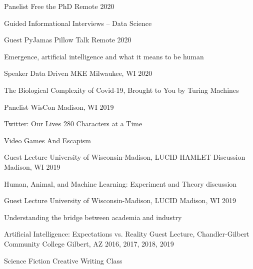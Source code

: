 \begin{cventries}
\cventry
    {Panelist}
    {Free the PhD}
    {Remote}
    {2020}
    {\begin{cvitems}
        \item {Guided Informational Interviews -- Data Science}
      \end{cvitems}}

\cventry
    {Guest}
    {PyJamas Pillow Talk}
    {Remote}
    {2020}
    {\begin{cvitems}
        \item {Emergence, artificial intelligence and what it means to be human}
      \end{cvitems}}

\cventry
    {Speaker}
    {Data Driven MKE}
    {Milwaukee, WI}
    {2020}
    {\begin{cvitems}
        \item {The Biological Complexity of Covid-19, Brought to You by Turing Machines}
      \end{cvitems}}

\cventry
    {Panelist}
    {WisCon}
    {Madison, WI}
    {2019}
    {\begin{cvitems}
        \item {Twitter: Our Lives 280 Characters at a Time}
        \item {Video Games And Escapism}
      \end{cvitems}}

\cventry
    {Guest Lecture}
    {University of Wisconsin-Madison, LUCID HAMLET Discussion}
    {Madison, WI}
    {2019}
    {\begin{cvitems}
        \item {Human, Animal, and Machine Learning: Experiment and Theory discussion}
      \end{cvitems}}

\cventry
    {Guest Lecture}
    {University of Wisconsin-Madison, LUCID}
    {Madison, WI}
    {2019}
    {\begin{cvitems}
        \item {Understanding the bridge between academia and industry}
      \end{cvitems}}

\cventry
    {Artificial Intelligence: Expectations vs. Reality}
    {Guest Lecture, Chandler-Gilbert Community College}
    {Gilbert, AZ}
    {2016, 2017, 2018, 2019}
    {\begin{cvitems}
        \item {Science Fiction Creative Writing Class}
      \end{cvitems}}


\end{cventries}
